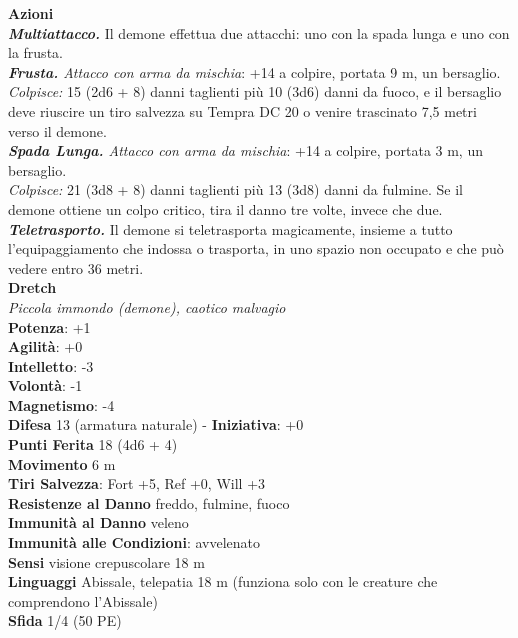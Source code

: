 \begin{multicols}{2}
\smallskip\textbf{Azioni}\\
\emph{\textbf{Multiattacco.}} Il demone effettua due attacchi: uno con la spada lunga e uno con la frusta.\\
\emph{\textbf{Frusta.} Attacco con arma da mischia}: +14 a colpire, portata 9 m, un bersaglio.\\
\emph{Colpisce:} 15 (2d6 + 8) danni taglienti più 10 (3d6) danni da fuoco, e il bersaglio deve riuscire un tiro salvezza su Tempra DC 20 o venire trascinato 7,5 metri verso il demone.\\
\emph{\textbf{Spada Lunga.} Attacco con arma da mischia}: +14 a colpire, portata 3 m, un bersaglio.\\
\emph{Colpisce:} 21 (3d8 + 8) danni taglienti più 13 (3d8) danni da fulmine. Se il demone ottiene un colpo critico, tira il danno tre volte, invece che due.\\
\emph{\textbf{Teletrasporto.}} Il demone si teletrasporta magicamente, insieme a tutto l'equipaggiamento che indossa o trasporta, in uno spazio non occupato e che può vedere entro 36 metri.\\

\medskip\textbf{Dretch}\\
\emph{Piccola immondo (demone), caotico malvagio}\\
\textbf{Potenza}: +1\\
\textbf{Agilità}: +0\\
\textbf{Intelletto}: -3\\
\textbf{Volontà}: -1\\
\textbf{Magnetismo}: -4\\
\textbf{Difesa} 13 (armatura naturale) - \textbf{Iniziativa}: +0\\
\textbf{Punti Ferita} 18 (4d6 + 4)\\
\textbf{Movimento} 6 m\\
\textbf{Tiri Salvezza}: Fort +5, Ref +0, Will +3\\
\textbf{Resistenze al Danno} freddo, fulmine, fuoco\\
\textbf{Immunità al Danno} veleno\\
\textbf{Immunità alle Condizioni}: avvelenato\\
\textbf{Sensi} visione crepuscolare 18 m\\
\textbf{Linguaggi} Abissale, telepatia 18 m (funziona solo con le creature che comprendono l'Abissale)\\

\textbf{Sfida} 1/4 (50 PE)\smallskip


\end{multicols}
